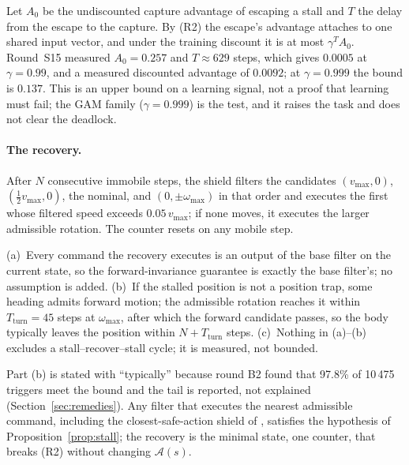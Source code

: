 \documentclass{l4dc2027}
\newcommand{\vmax}{v_{\max}}
\newcommand{\wmax}{\omega_{\max}}
\newcommand{\adm}{\mathcal{A}}
\begin{document}
\begin{remark}\label{rem:discount}
Let $A_0$ be the undiscounted capture advantage of escaping a stall and $T$ the delay from the escape to the capture. By (R2) the escape's advantage attaches to one shared input vector, and under the training discount it is at most $\gamma^{T} A_0$. Round~S15 measured $A_0 = 0.257$ and $T \approx 629$ steps, which gives $0.0005$ at $\gamma = 0.99$, and a measured discounted advantage of $0.0092$; at $\gamma = 0.999$ the bound is $0.137$. This is an upper bound on a learning signal, not a proof that learning must fail; the GAM family ($\gamma = 0.999$) is the test, and it raises the task and does not clear the deadlock.
\end{remark}

\paragraph{The recovery.} After $N$ consecutive immobile steps, the shield filters the candidates $(\vmax,0)$, $(\tfrac12\vmax,0)$, the nominal, and $(0,\pm\wmax)$ in that order and executes the first whose filtered speed exceeds $0.05\,\vmax$; if none moves, it executes the larger admissible rotation. The counter resets on any mobile step.

\begin{proposition}[Recovery]\label{prop:recovery}
(a)~Every command the recovery executes is an output of the base filter on the current state, so the forward-invariance guarantee is exactly the base filter's; no assumption is added. (b)~If the stalled position is not a position trap, some heading admits forward motion; the admissible rotation reaches it within $T_{\mathrm{turn}} = 45$ steps at $\wmax$, after which the forward candidate passes, so the body typically leaves the position within $N + T_{\mathrm{turn}}$ steps. (c)~Nothing in (a)--(b) excludes a stall--recover--stall cycle; it is measured, not bounded.
\end{proposition}

Part (b) is stated with ``typically'' because round B2 found that 97.8\% of 10\,475 triggers meet the bound and the tail is reported, not explained (Section~\ref{sec:remedies}). Any filter that executes the nearest admissible command, including the closest-safe-action shield of \citet{kim2025realizable}, satisfies the hypothesis of Proposition~\ref{prop:stall}; the recovery is the minimal state, one counter, that breaks (R2) without changing $\adm(s)$.
\end{document}
